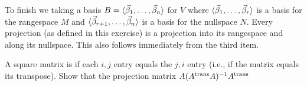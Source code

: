 \begin{exercises}
\begin{answer}
\begin{exparts}
          To finish we taking a basis 
          $B=\langle\vec{\beta}_1,\ldots,\vec{\beta}_n\rangle$ for $V$ where
          $\langle\vec{\beta}_1,\ldots,\vec{\beta}_r\rangle$ is a basis for 
          the rangespace $M$ and 
          $\langle\vec{\beta}_{r+1},\ldots,\vec{\beta}_n\rangle$ is a 
          basis for the nullspace $N$.
        \partsitem Every projection (as defined in this exercise) is 
          a projection into its rangespace and along its nullspace.
        \partsitem This also follows immediately from the third item.
      \end{exparts}
    \end{answer}
  \item 
    A square matrix is %
    if each \( i,j \) entry equals the
    \( j,i \) entry (i.e., if the matrix equals its transpose).
    Show that the projection matrix \( A({{A}^{\rm trans}}A)^{-1}{{A}^{\rm trans}} \) 

\end{exercises}
